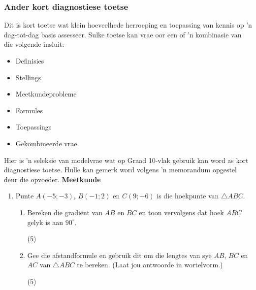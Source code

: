\subsubsection{Ander kort diagnostiese toetse}
Dit is kort toetse wat klein hoeveelhede herroeping en toepassing van kennis op 'n dag-tot-dag basis assesseer. Sulke toetse kan vrae oor een of 'n kombinasie van die volgende insluit:
\begin{itemize}[noitemsep]
\item
  Definisies
\item
  Stellings
\item
  Meetkundeprobleme
\item
  Formules
\item
  Toepassings
\item
  Gekombineerde vrae
\end{itemize}
Hier is 'n seleksie van modelvrae wat op Graad 10-vlak gebruik kan  word as kort diagnostiese toetse. Hulle kan gemerk word volgens 'n memorandum opgestel deur die opvoeder.
\textbf{Meetkunde}
\begin{enumerate}[itemsep=0pt, label=\textbf{\arabic*}. ] 
\item Punte $A(-5; -3)$, $B(-1; 2)$ en $C(9; -6)$ is die hoekpunte van $\triangle ABC$. 
\begin{enumerate}[itemsep=0pt,label=\textbf{(\alph*)}]
\item Bereken die gradi\"{e}nt van $AB$ en $BC$ en toon vervolgens dat hoek $ABC$ gelyk is aan $90^{\circ}$.				
\begin{flushright}(5)\end{flushright}
\item Gee die afstandformule en gebruik dit om die lengtes van sye
$AB$, $BC$ en $AC$ van $\triangle ABC$ te bereken. (Laat jou antwoorde in wortelvorm.)
\begin{flushright}(5)\end{flushright}
\end{enumerate}
\end{enumerate}

